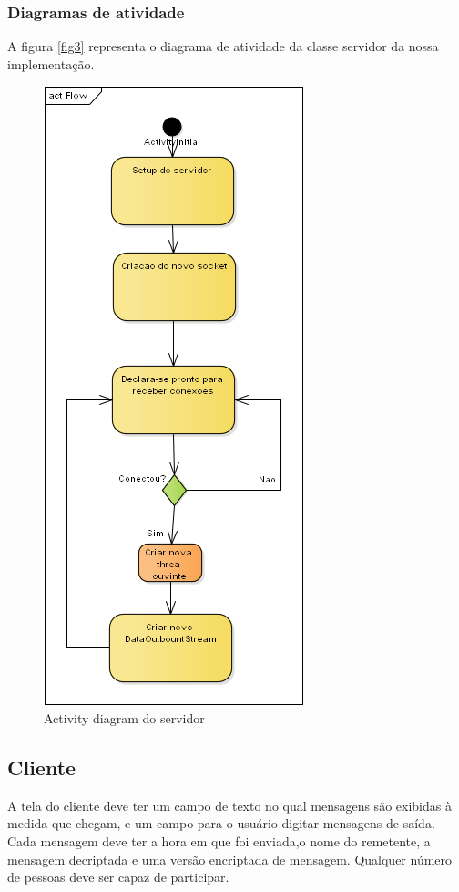 \documentclass[a4paper,12pt]{article}
\begin{document}
\subsubsection{Diagramas de atividade}
A figura \ref{fig3} representa o diagrama de atividade da classe servidor da nossa
implementação.
\begin{figure}[H]
\centering
\includegraphics[scale=0.4]{img/serverflow.png}    
\caption{Activity diagram do servidor}
\end{figure}
\subsection{Cliente}
A tela do cliente deve ter um campo de texto no qual mensagens são exibidas à medida que chegam, e um campo para o usuário digitar mensagens de saída. Cada mensagem deve ter a hora em que foi enviada,o nome do remetente, a mensagem decriptada e uma versão encriptada de mensagem. Qualquer número de pessoas deve ser capaz de participar.
\end{document}
